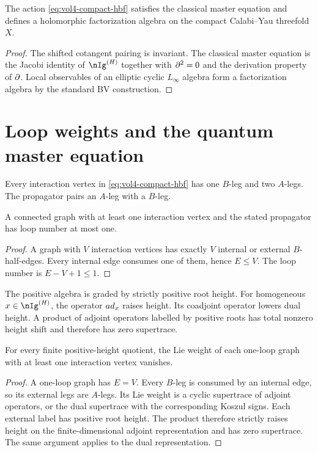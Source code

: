 \begin{theorem}
The action \eqref{eq:vol4-compact-hbf} satisfies the classical master equation and defines a holomorphic factorization algebra on the compact Calabi--Yau threefold $X$.
\end{theorem}
\begin{proof}
The shifted cotangent pairing is invariant.  The classical master equation is the Jacobi identity of $\nIg^{(H)}$ together with $\partial^2=0$ and the derivation property of $\partial$.  Local observables of an elliptic cyclic $L_\infty$ algebra form a factorization algebra by the standard BV construction.
\end{proof}

\section{Loop weights and the quantum master equation}
Every interaction vertex in \eqref{eq:vol4-compact-hbf} has one $B$-leg and two $A$-legs.  The propagator pairs an $A$-leg with a $B$-leg.

\begin{lemma}
A connected graph with at least one interaction vertex and the stated propagator has loop number at most one.
\end{lemma}
\begin{proof}
A graph with $V$ interaction vertices has exactly $V$ internal or external $B$-half-edges.  Every internal edge consumes one of them, hence $E\le V$.  The loop number is $E-V+1\le1$.
\end{proof}

The positive algebra is graded by strictly positive root height.  For homogeneous $x\in\nIg^{(H)}$, the operator $ad_x$ raises height.  Its coadjoint operator lowers dual height.  A product of adjoint operators labelled by positive roots has total nonzero height shift and therefore has zero supertrace.

\begin{proposition}\label{cyiv:loop-weights}
For every finite positive-height quotient, the Lie weight of each
one-loop graph with at least one interaction vertex vanishes.
\end{proposition}
\begin{proof}
A one-loop graph has $E=V$.
Every $B$-leg is consumed by an internal edge, so its external legs are
$A$-legs.
Its Lie weight is a cyclic supertrace of adjoint operators, or the
dual supertrace with the corresponding Koszul signs.
Each external label has positive root height.
The product therefore strictly raises height on the finite-dimensional
adjoint representation and has zero supertrace.
The same argument applies to the dual representation.
\end{proof}

